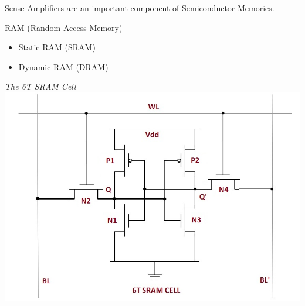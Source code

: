\documentclass[12pt, letterpaper]{article}
\begin{document}
Sense Amplifiers are an important component of Semiconductor Memories.

				RAM (Random Access Memory)
\begin{itemize}
    \item Static RAM (SRAM)
    \item Dynamic RAM (DRAM)
\end{itemize}

\emph{The 6T SRAM Cell} \\
\includegraphics [scale=0.5]{sram-cell}

 
\end{document}
